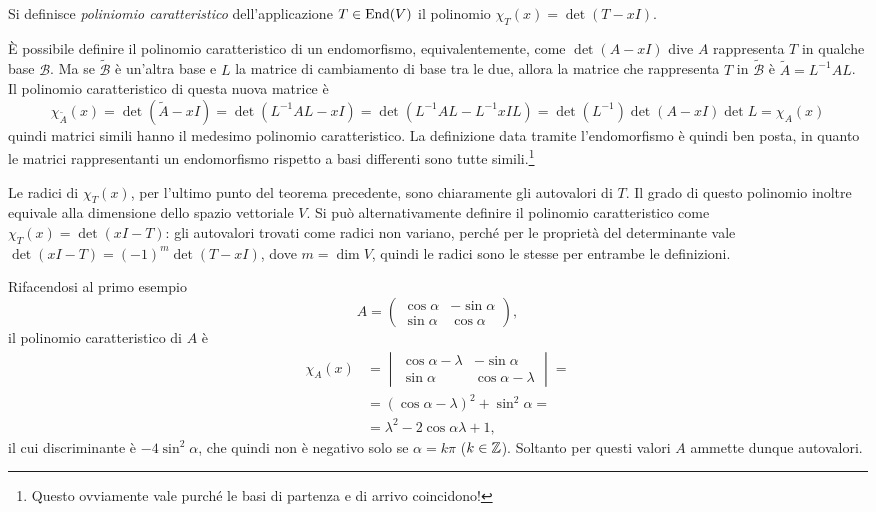 \begin{definizione} \label{d:polinomio-caratteristico}
	Si definisce \emph{poliniomio caratteristico} dell'applicazione $T\in\operatorname{End}(V)$ il polinomio $\chi_T(x)=\det(T-xI)$.
\end{definizione}
È possibile definire il polinomio caratteristico di un endomorfismo, equivalentemente, come $\det(A-xI)$ dive $A$ rappresenta $T$ in qualche base $\mathcal B$.
Ma se $\tilde{\mathcal B}$ è un'altra base e $L$ la matrice di cambiamento di base tra le due, allora la matrice che rappresenta $T$ in $\tilde{\mathcal B}$ è $\tilde{A}=L^{-1}AL$.
Il polinomio caratteristico di questa nuova matrice è
\begin{equation*}
	\chi_{\tilde{A}}(x)=\det(\tilde{A}-xI)=\det(L^{-1}AL-xI)=\det(L^{-1}AL-L^{-1}xIL)=\det(L^{-1})\det(A-xI)\det L=\chi_A(x)
\end{equation*}
quindi matrici simili hanno il medesimo polinomio caratteristico.
La definizione data tramite l'endomorfismo è quindi ben posta, in quanto le matrici rappresentanti un endomorfismo rispetto a basi differenti sono tutte simili.\footnote{Questo ovviamente vale purch\'e le basi di partenza e di arrivo coincidono!}

Le radici di $\chi_T(x)$, per l'ultimo punto del teorema precedente, sono chiaramente gli autovalori di $T$. Il grado di questo polinomio inoltre equivale alla dimensione dello spazio vettoriale $V$.
Si può alternativamente definire il polinomio caratteristico come $\chi_T(x)=\det(xI-T)$: gli autovalori trovati come radici non variano, perché per le proprietà del determinante vale $\det(xI-T)=(-1)^m\det(T-xI)$, dove $m=\dim V$, quindi le radici sono le stesse per entrambe le definizioni.

Rifacendosi al primo esempio
\begin{equation*}
A=\begin{pmatrix}\cos\alpha&-\sin\alpha\\\sin\alpha&\cos\alpha\end{pmatrix},
\end{equation*}
il polinomio caratteristico di $A$ è
\begin{equation*}
	\begin{split}
		\chi_A(x)&=\begin{vmatrix}\cos\alpha-\lambda&-\sin\alpha\\\sin\alpha&\cos\alpha-\lambda\end{vmatrix}=\\
		&=(\cos\alpha-\lambda)^2+\sin^2\alpha=\\
		&=\lambda^2-2\cos\alpha\lambda+1,
	\end{split}
\end{equation*}
il cui discriminante è $-4\sin^2\alpha$, che quindi non è negativo solo se $\alpha=k\pi$ ($k\in\mathbb{Z}$).
Soltanto per questi valori $A$ ammette dunque autovalori.

